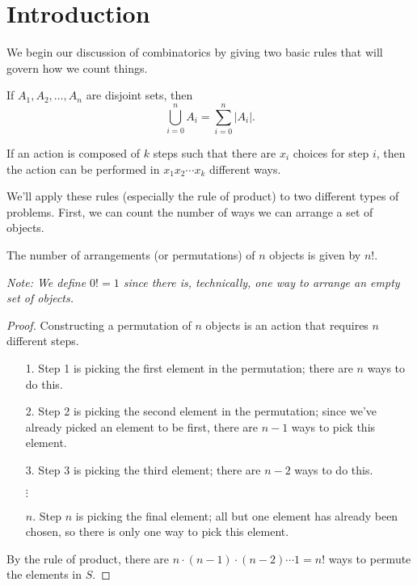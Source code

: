 \documentclass[../m55main.tex]{chapters}
\begin{document}
\section{Introduction}
We begin our discussion of combinatorics by giving two basic rules that will govern how we count things.

\begin{theorem}
    If $A_1, A_2, \ldots, A_n$ are disjoint sets, then
    \[ \bigcup_{i=0}^n A_i = \sum_{i=0}^n |A_i|. \]
\end{theorem}


\begin{theorem}
    If an action is composed of $k$ steps such that there are $x_i$ choices for step $i$, then the action can be performed in $x_1 x_2 \cdots x_k$ different ways.
\end{theorem}


We'll apply these rules (especially the rule of product) to two different types of problems.
First, we can count the number of ways we can arrange a set of objects.

\begin{theorem}
    The number of arrangements (or permutations) of $n$ objects is given by $n!$. %

    \medskip
    \textit{Note: We define $0! = 1$ since there is, technically, one way to arrange an empty set of objects.}
\end{theorem}

\begin{proof}
    Constructing a permutation of $n$ objects is an action that requires $n$ different steps.
    \begin{itemize}
        \item [1.] Step 1 is picking the first element in the permutation; there are $n$ ways to do this.
        \item [2.] Step 2 is picking the second element in the permutation; since we've already picked an element to be first, there are $n-1$ ways to pick this element.
        \item [3.] Step 3 is picking the third element; there are $n-2$ ways to do this.
        \item [$\vdots$\phantom{.}]
        \item [$n$.] Step $n$ is picking the final element; all but one element has already been chosen, so there is only one way to pick this element.
    \end{itemize}
    By the rule of product, there are $n \cdot (n-1) \cdot (n-2) \cdots 1 = n!$ ways to permute the elements in $S$.
\end{proof}
\end{document}
